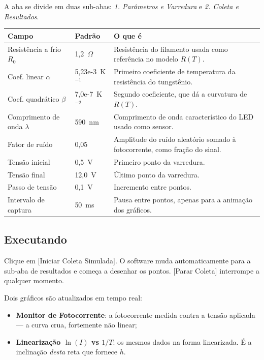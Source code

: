\documentclass[11pt,a4paper]{article}
\newcommand{\botao}[1]{\textsf{[#1]}}
\newcommand{\campo}[1]{\textsf{\textit{#1}}}
\begin{document}
A aba se divide em duas sub-abas: \campo{1. Parâmetros e Varredura} e
\campo{2. Coleta e Resultados}.

\begin{center}
\begin{longtable}{@{}p{4.6cm}p{2.2cm}p{7.5cm}@{}}
\toprule
\textbf{Campo} & \textbf{Padrão} & \textbf{O que é} \\
\midrule
\endhead
Resistência a frio $R_0$ & 1,2~$\Omega$ &
Resistência do filamento usada como referência no modelo $R(T)$. \\[0.3em]
Coef. linear $\alpha$ & 5,23e-3~K$^{-1}$ &
Primeiro coeficiente de temperatura da resistência do tungstênio. \\[0.3em]
Coef. quadrático $\beta$ & 7,0e-7~K$^{-2}$ &
Segundo coeficiente, que dá a curvatura de $R(T)$. \\[0.3em]
Comprimento de onda $\lambda$ & 590~nm &
Comprimento de onda característico do LED usado como sensor. \\[0.3em]
Fator de ruído & 0,05 &
Amplitude do ruído aleatório somado à fotocorrente, como fração do sinal. \\[0.3em]
Tensão inicial & 0,5~V & Primeiro ponto da varredura. \\[0.3em]
Tensão final & 12,0~V & Último ponto da varredura. \\[0.3em]
Passo de tensão & 0,1~V & Incremento entre pontos. \\[0.3em]
Intervalo de captura & 50~ms &
Pausa entre pontos, apenas para a animação dos gráficos. \\
\bottomrule
\end{longtable}
\end{center}

\subsection{Executando}

Clique em \botao{Iniciar Coleta Simulada}. O software muda automaticamente para
a sub-aba de resultados e começa a desenhar os pontos. \botao{Parar Coleta}
interrompe a qualquer momento.

Dois gráficos são atualizados em tempo real:

\begin{itemize}[nosep]
  \item \textbf{Monitor de Fotocorrente}: a fotocorrente medida contra a tensão
        aplicada --- a curva crua, fortemente não linear;
  \item \textbf{Linearização $\ln(I)$ vs $1/T$}: os mesmos dados na forma
        linearizada. É a inclinação \emph{desta} reta que fornece $h$.
\end{itemize}
\end{document}
